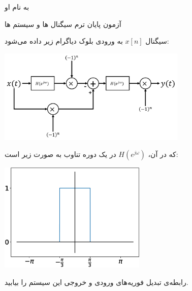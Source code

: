 \documentclass{article}
\begin{document}
\begin{center}
\large

به نام او

آزمون پایان ترم سیگنال ها و سیستم ها
\end{center}

\hrulefill

\large


سیگنال 
$
x[n]
$
به ورودی بلوک دیاگرام زیر داده می‌شود:
\begin{center}
\includegraphics[width=90mm]{block.pdf}
\end{center}
که در آن، 
$
H(e^{j\omega})
$
در یک دوره تناوب به صورت زیر است:

\begin{center}
\includegraphics[width=70mm]{final_h}
\end{center}

رابطه‌ی تبدیل فوریه‌های ورودی و خروجی این سیستم را بیابید.
\end{document}
